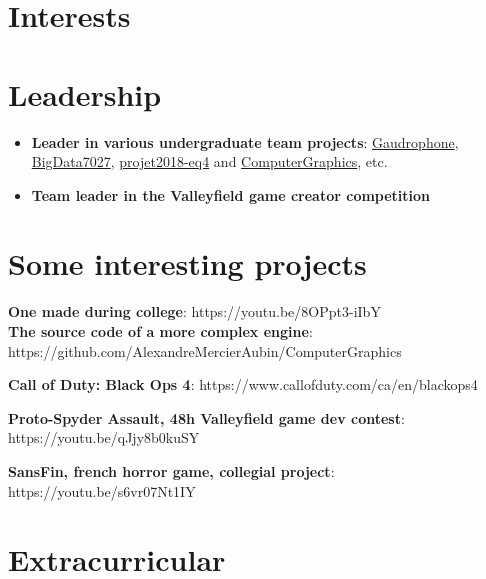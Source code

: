 \documentclass[10pt]{article} %
\begin{document}

\section{Interests}


\section{Leadership}
\begin{itemize}
\item \textbf{Leader in various undergraduate team projects}: \href{https://github.com/AlexandreMercierAubin/Gaudrophone}{Gaudrophone}, \href{https://github.com/AlexandreMercierAubin/BigData7027}{BigData7027}, \href{https://github.com/AlexandreMercierAubin/projet2018-eq4}{projet2018-eq4} and \href{https://github.com/AlexandreMercierAubin/ComputerGraphics}{ComputerGraphics}, etc. \\ 
\item \textbf{Team leader in the Valleyfield game creator competition}
\end{itemize}

\section{Some interesting projects}

{
\textbf{One made during college}: https://youtu.be/8OPpt3-iIbY\\
\textbf{The source code of a more complex engine}: https://github.com/AlexandreMercierAubin/ComputerGraphics\\

}

{
\textbf{Call of Duty: Black Ops 4}: https://www.callofduty.com/ca/en/blackops4

\textbf{Proto-Spyder Assault, 48h Valleyfield game dev contest}: https://youtu.be/qJjy8b0kuSY

\textbf{SansFin, french horror game, collegial project}: https://youtu.be/s6vr07Nt1IY
}

\section{Extracurricular}
\end{document}
